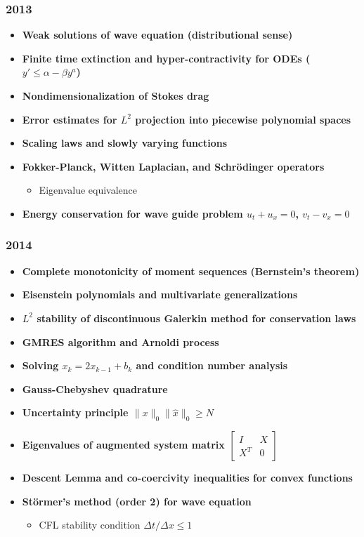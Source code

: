 \subsubsection*{2013}
\begin{itemize}
    \item \textbf{Weak solutions of wave equation (distributional sense)}
    \item \textbf{Finite time extinction and hyper-contractivity for ODEs ($y' \leq \alpha - \beta y^a$)}
    \item \textbf{Nondimensionalization of Stokes drag}
    \item \textbf{Error estimates for $L^2$ projection into piecewise polynomial spaces}
    \item \textbf{Scaling laws and slowly varying functions}
    \item \textbf{Fokker-Planck, Witten Laplacian, and Schr\"odinger operators}
        \begin{itemize}
            \item Eigenvalue equivalence
        \end{itemize}
    \item \textbf{Energy conservation for wave guide problem $u_t + u_x = 0$, $v_t - v_x = 0$}
\end{itemize}

\subsubsection*{2014}
\begin{itemize}
    \item \textbf{Complete monotonicity of moment sequences (Bernstein's theorem)}
    \item \textbf{Eisenstein polynomials and multivariate generalizations}
    \item \textbf{$L^2$ stability of discontinuous Galerkin method for conservation laws}
    \item \textbf{GMRES algorithm and Arnoldi process}
    \item \textbf{Solving $x_k = 2x_{k-1} + b_k$ and condition number analysis}
    \item \textbf{Gauss-Chebyshev quadrature}
    \item \textbf{Uncertainty principle $\|x\|_0 \|\hat{x}\|_0 \geq N$}
    \item \textbf{Eigenvalues of augmented system matrix $\begin{bmatrix} I & X \\ X^T & 0 \end{bmatrix}$}
    \item \textbf{Descent Lemma and co-coercivity inequalities for convex functions}
    \item \textbf{St\"ormer's method (order 2) for wave equation}
        \begin{itemize}
            \item CFL stability condition $\Delta t / \Delta x \leq 1$
        \end{itemize}
\end{itemize}

